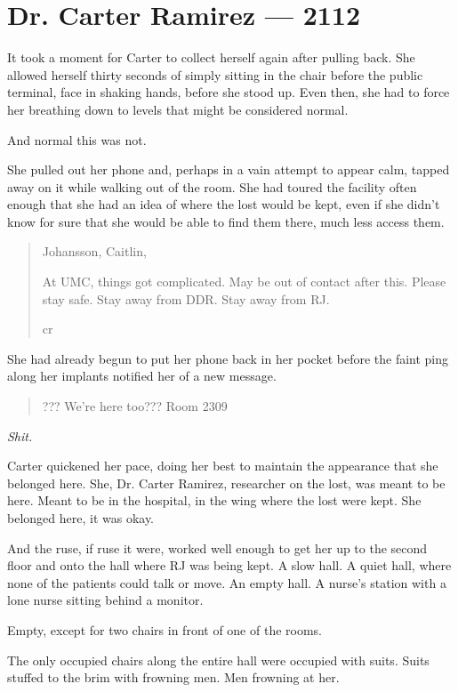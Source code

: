 \hypertarget{dr-carter-ramirez-2112}{%
\chapter*{Dr. Carter Ramirez — 2112}\label{dr-carter-ramirez-2112}}

It took a moment for Carter to collect herself again after pulling back. She allowed herself thirty seconds of simply sitting in the chair before the public terminal, face in shaking hands, before she stood up. Even then, she had to force her breathing down to levels that might be considered normal.

And normal this was not.

She pulled out her phone and, perhaps in a vain attempt to appear calm, tapped away on it while walking out of the room. She had toured the facility often enough that she had an idea of where the lost would be kept, even if she didn't know for sure that she would be able to find them there, much less access them.

\begin{quote}
Johansson, Caitlin,

At UMC, things got complicated. May be out of contact after this. Please stay safe. Stay away from DDR. Stay away from RJ.

cr
\end{quote}

She had already begun to put her phone back in her pocket before the faint ping along her implants notified her of a new message.

\begin{quote}
??? We're here too??? Room 2309
\end{quote}

\emph{Shit.}

Carter quickened her pace, doing her best to maintain the appearance that she belonged here. She, Dr. Carter Ramirez, researcher on the lost, was meant to be here. Meant to be in the hospital, in the wing where the lost were kept. She belonged here, it was okay.

And the ruse, if ruse it were, worked well enough to get her up to the second floor and onto the hall where RJ was being kept. A slow hall. A quiet hall, where none of the patients could talk or move. An empty hall. A nurse's station with a lone nurse sitting behind a monitor.

Empty, except for two chairs in front of one of the rooms.

The only occupied chairs along the entire hall were occupied with suits. Suits stuffed to the brim with frowning men. Men frowning at her.

